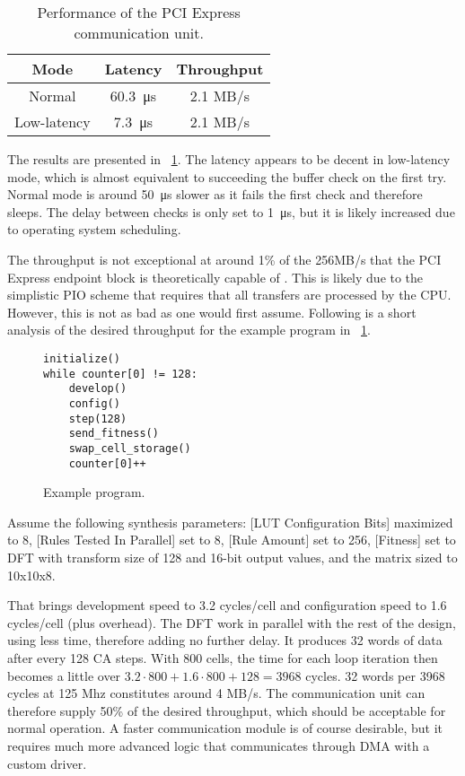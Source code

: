 \begin{table}[!ht]
    \renewcommand{\arraystretch}{1.4}
    \centering
    \begin{tabular}{c|c|c}
        \bfseries Mode & \bfseries Latency & \bfseries Throughput \\
        \hline
        Normal & \SI{60.3}{\micro\second} & 2.1 MB/s \\
        Low-latency & \SI{7.3}{\micro\second} & 2.1 MB/s \\
    \end{tabular}
    \caption[Communication performance]{
        Performance of the PCI Express communication unit.
    }
    \label{tab:communication-performance}
\end{table}

The results are presented in \tablename~\ref{tab:communication-performance}.
The latency appears to be decent in low-latency mode, which is almost equivalent to succeeding the buffer check on the first try.
Normal mode is around \SI{50}{\micro\second} slower as it fails the first check and therefore sleeps.
The delay between checks is only set to \SI{1}{\micro\second}, but it is likely increased due to operating system scheduling.

The throughput is not exceptional at around 1\% of the 256MB/s that the PCI Express endpoint block is theoretically capable of \cite{ug672}.
This is likely due to the simplistic PIO scheme that requires that all transfers are processed by the CPU.
However, this is not as bad as one would first assume.
Following is a short analysis of the desired throughput for the example program in \figurename~\ref{fig:example-program}.

\begin{figure}[!ht]
\begin{lstlisting}[xleftmargin=0.35\textwidth]
initialize()
while counter[0] != 128:
    develop()
    config()
    step(128)
    send_fitness()
    swap_cell_storage()
    counter[0]++
\end{lstlisting}
\caption[Example program] {
    Example program.
}
\label{fig:example-program}
\end{figure}

Assume the following synthesis parameters:
[LUT Configuration Bits] maximized to 8,
[Rules Tested In Parallel] set to 8,
[Rule Amount] set to 256,
[Fitness] set to DFT with transform size of 128 and 16-bit output values,
and the matrix sized to 10x10x8.

That brings development speed to 3.2 cycles/cell and configuration speed to 1.6 cycles/cell (plus overhead)\footnotemark.
The DFT work in parallel with the rest of the design, using less time, therefore adding no further delay.
It produces 32 words of data after every 128 CA steps.
With 800 cells, the time for each loop iteration then becomes a little over $3.2 \cdot 800 + 1.6 \cdot 800 + 128 = 3968$ cycles.
32 words per 3968 cycles at 125 Mhz constitutes around 4 MB/s.
The communication unit can therefore supply 50\% of the desired throughput, which should be acceptable for normal operation.
A faster communication module is of course desirable, but it requires much more advanced logic that communicates through DMA with a custom driver.

